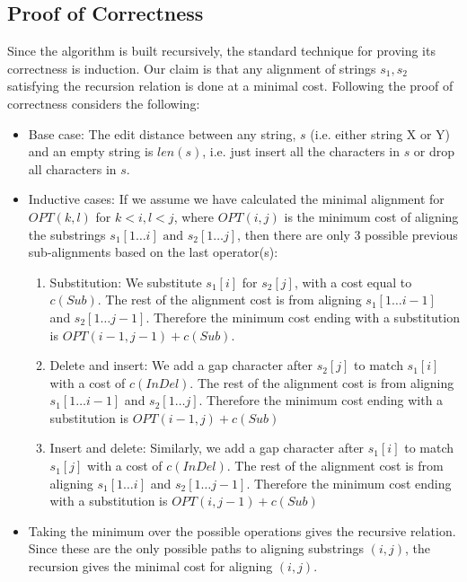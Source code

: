 \documentclass[12pt, authoryear]{elsarticle}
\begin{document}
\subsection{Proof of Correctness}

Since the algorithm is built recursively, the standard technique for proving its correctness is induction. Our claim is that any alignment of strings $s_1, s_2$ satisfying the recursion relation is done at a minimal cost. Following \cite{aicher} the proof of correctness considers the following:

\begin{itemize}
	\item Base case: The edit distance between any string, $s$ (i.e. either string X or Y) and an empty string is $len(s)$, i.e. just insert all the characters in $s$ or drop all characters in $s$. 
	
	\item Inductive cases: If we assume we have calculated the minimal alignment  for $OPT(k,l)$ for $k < i, l < j$, where $ O P T ( i , j )$  is the minimum cost of aligning the substrings $ s _ { 1 } [ 1 \ldots i ] \text { and } s _ { 2 } [ 1 \ldots j ]$, then there are only 3 possible previous sub-alignments based on the last operator(s):
	
\begin{enumerate}
	\item Substitution: We substitute $s_1[i]$ for $s_2[j]$, with a cost equal to $c(Sub)$. The rest of the alignment cost is from aligning $s_1[1\dots i-1]$ and $s_2[1\dots j-1]$. Therefore the minimum cost ending with a substitution is $OPT (i - 1, j - 1) + c(Sub)$.
	
	\item Delete and insert: We add a gap character after $s_2[j]$ to match $s_1[i]$ with a cost of $c(InDel)$. The rest of the alignment cost is from aligning $s_1[1\dots i-1]$ and $s_2[1\dots j]$. Therefore the minimum cost ending with a substitution is $OPT (i - 1, j) + c(Sub)$
	
	\item Insert and delete: Similarly, we add a gap character after $s_1[i]$ to match $s_1[j]$ with a cost of $c(InDel)$. The rest of the alignment cost is from aligning $s_1[1\dots i]$ and $s_2[1\dots j-1]$. Therefore the minimum cost ending with a substitution is $OPT (i, j − 1) + c(Sub)$
\end{enumerate}

\item Taking the minimum over the possible operations gives the recursive relation. Since these are the only possible paths to aligning substrings $(i,j)$, the recursion gives the minimal cost for aligning $(i,j)$.

\end{itemize}
\end{document}
